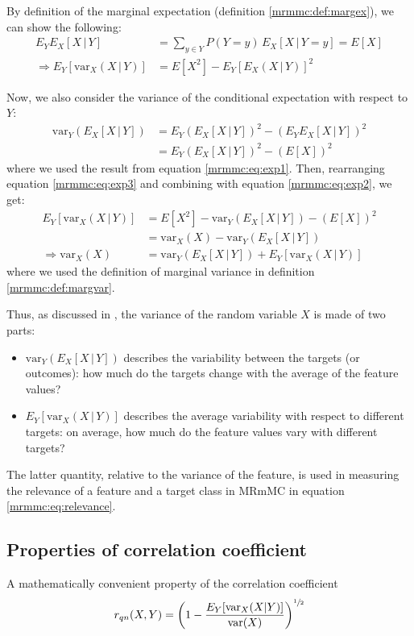 \documentclass[12pt, twoside, a4paper]{report}
\def\var{\text{var}}
\begin{document}
By definition of the marginal expectation (definition \ref{mrmmc:def:margex}), we can show the following:
\begin{align}
E_YE_X[X \, | \, Y] &= \sum_{y \in Y} P(Y=y) \, E_X[X \, | \, Y=y] = E[X] \label{mrmmc:eq:exp1} \\
\Rightarrow E_Y [ \var_X(X \, | \, Y) ] &= E[X^2] - E_Y [ E_X(X\,|\,Y) ] ^2 \label{mrmmc:eq:exp2}
\end{align}

Now, we also consider the variance of the conditional expectation with respect to $Y$:
\begin{align}
\var_Y (E_X[X \, | \, Y]) &= E_Y \left( E_X[X \, | \, Y]\right)^2 - \left( E_YE_X[X \, | \, Y] \right)^2 \\
&= E_Y \left( E_X[X \, | \, Y]\right)^2 - \left( E[X] \right)^2 \label{mrmmc:eq:exp3}
\end{align}
where we used the result from equation \ref{mrmmc:eq:exp1}. Then, rearranging equation \ref{mrmmc:eq:exp3} and combining with equation \ref{mrmmc:eq:exp2}, we get:
\begin{align*}
E_Y [ \var_X(X \, | \, Y) ] &= E[X^2] - \var_Y (E_X[X \, | \, Y]) - \left( E[X] \right)^2 \\
&= \var_X(X) - \var_Y (E_X[X \, | \, Y]) \\
\Rightarrow \var_X(X) &= \var_Y (E_X[X \, | \, Y]) + E_Y [ \var_X(X \, | \, Y) ]
\end{align*}
where we used the definition of marginal variance in definition \ref{mrmmc:def:margvar}.

Thus, as discussed in \cite{RefWorks:187}, the variance of the random variable $X$ is made of two parts: 
\begin{itemize}
  \item $\var_Y (E_X[X \, | \, Y])$ describes the variability between the targets (or outcomes): how much do the targets change with the average of the feature values?
  
  \item $E_Y [ \var_X(X \, | \, Y) ]$ describes the average variability with respect to different targets: on average, how much do the feature values vary with different targets?
\end{itemize}

The latter quantity, relative to the variance of the feature, is used in measuring the relevance of a feature and a target class in MRmMC in equation \ref{mrmmc:eq:relevance}.

\subsection{Properties of correlation coefficient}
A mathematically convenient property of the correlation coefficient
\begin{align*}
r_{qn}(X, Y) = \left( 1 - \frac{E_Y[\var_X(X|Y)]}{\var(X)} \right)^{\sfrac{1}{2}}
\end{align*}
\end{document}
